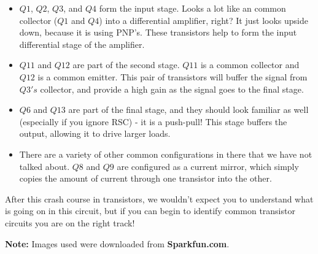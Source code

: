\documentclass[a4paper, 11pt]{article} %
\begin{document}
\begin{itemize}
\item $Q1$, $Q2$, $Q3$, and $Q4$ form the input stage. Looks a lot like an common collector ($Q1$ and $Q4$) into a differential amplifier, right? It just looks upside down, because it is using PNP's. These transistors help to form the input differential stage of the amplifier.
\item $Q11$ and $Q12$ are part of the second stage. $Q11$ is a common collector and $Q12$ is a common emitter. This pair of transistors will buffer the signal from $Q3's$ collector, and provide a high gain as the signal goes to the final stage.
\item $Q6$ and $Q13$ are part of the final stage, and they should look familiar as well (especially if you ignore RSC) - it is a push-pull! This stage buffers the output, allowing it to drive larger loads.
\item There are a variety of other common configurations in there that we have not talked about. $Q8$ and $Q9$ are configured as a current mirror, which simply copies the amount of current through one transistor into the other.
\end{itemize}

After this crash course in transistors, we wouldn't expect you to understand what is going on in this circuit, but if you can begin to identify common transistor circuits you are on the right track!

\textbf{Note:} Images used were downloaded from \textbf{Sparkfun.com}.
\end{document}
